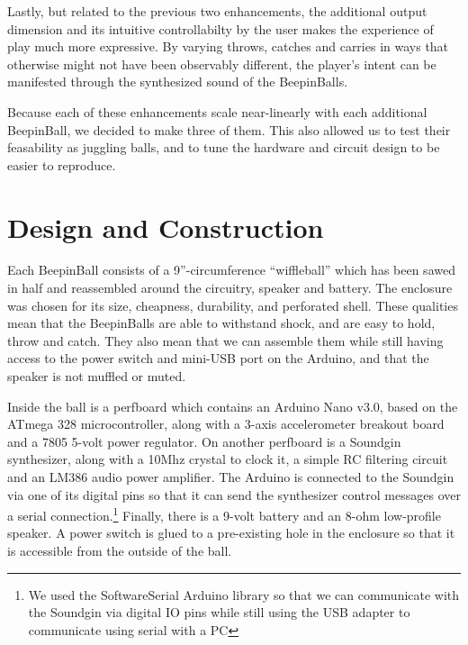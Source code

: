 \documentclass{nime-alternate}
\begin{document}
Lastly, but related to the previous two enhancements, the additional output 
dimension and its intuitive controllabilty by the user makes the experience
of play much more expressive. By varying throws, catches and carries in ways
that otherwise might not have been observably different, the player's intent 
can be manifested through the synthesized sound of the BeepinBalls.

Because each of these enhancements scale near-linearly with each additional
BeepinBall, we decided to make three of them. This also allowed us to test 
their feasability as juggling balls, and to tune the hardware and circuit design
to be easier to reproduce.

\section{Design and Construction}

Each BeepinBall consists of a 9''-circumference ``wiffleball'' which has been
sawed in half and reassembled around the circuitry, speaker and battery. The
enclosure was chosen for its size, cheapness, durability, and perforated shell.
These qualities mean that the BeepinBalls are able to withstand shock, and are 
easy to hold, throw and catch. They also mean that we can assemble them
while still having access to the power switch and mini-USB port on the Arduino,
and that the speaker is not muffled or muted.

Inside the ball is a perfboard which contains an Arduino Nano v3.0, based on
the ATmega 328 microcontroller, along with a 3-axis accelerometer breakout board
and a 7805 5-volt power regulator. On another perfboard is a Soundgin synthesizer,
along with a 10Mhz crystal to clock it, a simple RC filtering circuit and an
LM386 audio power amplifier. The Arduino is connected to the Soundgin via one
of its digital pins so that it can send the synthesizer control messages over 
a serial connection.\footnote{We used the SoftwareSerial Arduino library so that
we can communicate with the Soundgin via digital IO pins while still using the USB
adapter to communicate using serial with a PC} Finally, there is a 9-volt battery 
and an 8-ohm low-profile speaker. A power switch is glued to a 
pre-existing hole in the enclosure so that it is accessible from the outside of the ball.
\end{document}
